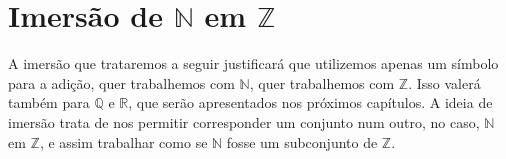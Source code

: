 \documentclass[../main.tex]{subfiles}
\begin{document}

\section{Imersão de $\mathbb{N}$ em $\mathbb{Z}$}
A imersão que trataremos a seguir justificará que utilizemos apenas um símbolo para a adição, quer trabalhemos com $\mathbb{N}$, quer trabalhemos com $\mathbb{Z}$. Isso valerá também para $\mathbb{Q}$ e $\mathbb{R}$, que serão apresentados nos próximos capítulos. A ideia de imersão trata de nos permitir corresponder um conjunto num outro, no caso, $\mathbb{N}$ em $\mathbb{Z}$, e assim trabalhar como se $\mathbb{N}$ fosse um subconjunto de $\mathbb{Z}$.
\end{document}
